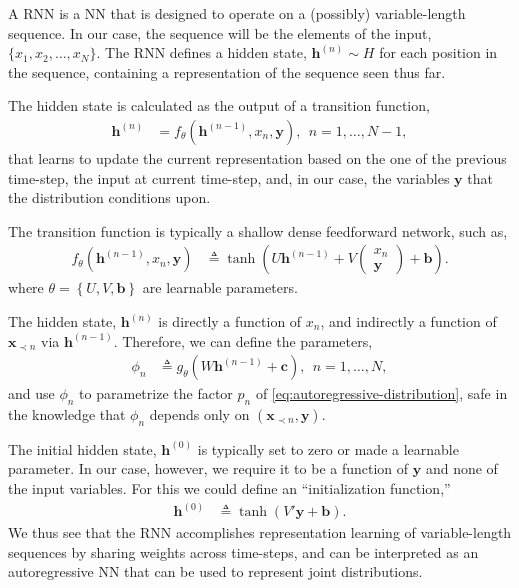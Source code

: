 A RNN is a NN that is designed to operate on a (possibly) variable-length sequence. In our case, the sequence will be the elements of the input, $\{x_1,x_2,\ldots,x_N\}$. The RNN defines a hidden state, $\mathbf{h}^{(n)}\sim H$ for each position in the sequence, containing a representation of the sequence seen thus far.

The hidden state is calculated as the output of a transition function,
\begin{align}\label{eqn:rnn-transition}
	\mathbf{h}^{(n)} &= f_\theta(\mathbf{h}^{(n-1)},x_n,\mathbf{y}),\ \ n=1,\ldots,N-1,
\end{align}
that learns to update the current representation based on the one of the previous time-step, the input at current time-step, and, in our case, the variables $\mathbf{y}$ that the distribution conditions upon.

The transition function is typically a shallow dense feedforward network, such as,
\begin{align*}
	f_\theta(\mathbf{h}^{(n-1)},x_n,\mathbf{y}) &\triangleq \tanh\left(U\mathbf{h}^{(n-1)} + V\begin{pmatrix}x_n\\ \mathbf{y}\end{pmatrix} + \mathbf{b} \right).
\end{align*}
where $\theta=\left\{U,V,\mathbf{b}\right\}$ are learnable parameters.

The hidden state, $\mathbf{h}^{(n)}$ is directly a function of $x_n$, and indirectly a function of $\mathbf{x}_{\prec n}$ via $\mathbf{h}^{(n-1)}$. Therefore, we can define the parameters,
\begin{align*}
	\phi_n &\triangleq g_\theta(W\mathbf{h}^{(n-1)}+\mathbf{c}),\ \ n=1,\ldots,N,
\end{align*}
and use $\phi_n$ to parametrize the factor $p_n$ of \eqref{eq:autoregressive-distribution}, safe in the knowledge that $\phi_n$ depends only on $(\mathbf{x}_{\prec n},\mathbf{y})$.

The initial hidden state, $\mathbf{h}^{(0)}$ is typically set to zero or made a learnable parameter. In our case, however, we require it to be a function of $\mathbf{y}$ and none of the input variables. For this we could define an ``initialization function,''
\begin{align*}
	\mathbf{h}^{(0)} &\triangleq \tanh\left(V'\mathbf{y} + \mathbf{b}\right).
\end{align*}
We thus see that the RNN accomplishes representation learning of variable-length sequences by sharing weights across time-steps, and can be interpreted as an autoregressive NN that can be used to represent joint distributions.

